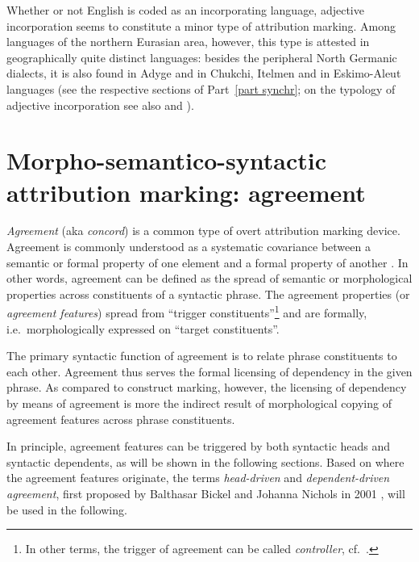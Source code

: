 Whether or not English is coded as an incorporating language, adjective incorporation seems to constitute a minor type of attribution marking. Among languages of the northern Eurasian area, however, this type is attested in geographically quite distinct languages: besides the peripheral North Germanic dialects, it is also found in Adyge and in Chukchi, Itelmen and in Eskimo-Aleut languages (see the respective sections of Part~\ref{part synchr}; on the typology of adjective incorporation see also \cite[225–236]{dahl2004a} and \cite[28–29]{dahl2015a}).

\section[Agreement marking]{Morpho-semantico-syntactic attribution marking: agreement}

\emph{Agreement} (aka \emph{concord}) is a common type of overt attribution marking device. Agreement is commonly understood as a systematic covariance between a semantic or formal property of one element and a formal property of another \cite[610]{steele1978}. In other words, agreement can be defined as the spread of semantic or morphological properties across constituents of a syntactic phrase. The agreement properties (or \emph{agreement features}) spread from “trigger constituents”\footnote{In other terms, the trigger of agreement can be called \emph{controller}, cf.~\citealt{corbett2006}.} and are formally, i.e.~morphologically expressed on “target constituents”.

The primary syntactic function of agreement is to relate phrase constituents to each other. Agreement thus serves the formal licensing of dependency in the given phrase. As compared to construct marking, however, the licensing of dependency by means of agreement is more the indirect result of morphological copying of agreement features across phrase constituents.

In principle, agreement features can be triggered by both syntactic heads and syntactic dependents, as will be shown in the following sections. Based on where the agreement features originate, the terms \emph{head\hyp{}driven} and \emph{dependent-driven agreement}, first proposed by Balthasar Bickel and Johanna Nichols in 2001 \citep[published as][]{bickel-etal2007}, will be used in the following.


